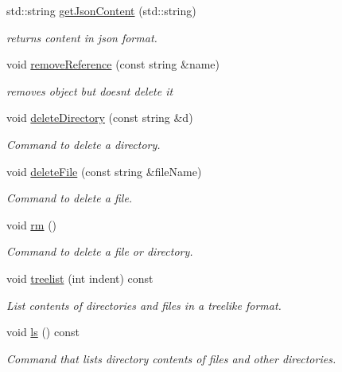 \begin{DoxyCompactItemize}
\item 
std\+::string \hyperlink{class_directory_ad4b9f8d48a33526ac1c61dbce3753f1d}{get\+Json\+Content} (std\+::string)
\begin{DoxyCompactList}\small\item\em returns content in json format. \end{DoxyCompactList}\item 
void \hyperlink{class_directory_abaf8fe6ce68c3ed4ee7139943d719790}{remove\+Reference} (const string \&name)
\begin{DoxyCompactList}\small\item\em removes object but doesnt delete it \end{DoxyCompactList}\item 
void \hyperlink{class_directory_a8d233286b4964b8261543fa823e66f9e}{delete\+Directory} (const string \&d)
\begin{DoxyCompactList}\small\item\em Command to delete a directory. \end{DoxyCompactList}\item 
void \hyperlink{class_directory_ac5d2847c135eff94ce4fedd8099de18a}{delete\+File} (const string \&file\+Name)
\begin{DoxyCompactList}\small\item\em Command to delete a file. \end{DoxyCompactList}\item 
void \hyperlink{class_directory_ad764e9b4d0568c0acf788a15e0621f1a}{rm} ()
\begin{DoxyCompactList}\small\item\em Command to delete a file or directory. \end{DoxyCompactList}\item 
void \hyperlink{class_directory_af21c038562a88b24df0cb6e0c361febd}{treelist} (int indent) const
\begin{DoxyCompactList}\small\item\em List contents of directories and files in a treelike format. \end{DoxyCompactList}\item 
void \hyperlink{class_directory_a97bf31f9a554ff687a410f735d8770dd}{ls} () const
\begin{DoxyCompactList}\small\item\em Command that lists directory contents of files and other directories. \end{DoxyCompactList}\item 

\end{DoxyCompactItemize}
